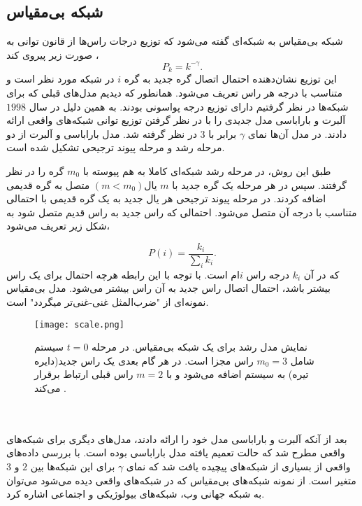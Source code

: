 \subsection{شبکه بی‌مقیاس}
شبکه بی‌مقیاس به شبکه‌ای گفته می‌شود که توزیع درجات راس‌ها از قانون توانی  به صورت زیر پیروی کند \cite{bar}،
\begin{equation}
P_{k} = k^{-\gamma}. 
\end{equation}
این توزیع نشان‌دهنده احتمال اتصال گره جدید به گره $i$ در شبکه مورد نظر است و متناسب با درجه هر راس تعریف می‌شود. 
همانطور که دیدیم مدل‌های قبلی که برای شبکه‌ها در نظر گرفتیم دارای توزیع درجه پواسونی بودند. به همین دلیل در سال $1998$ آلبرت و باراباسی مدل جدیدی را با در نظر گرفتن توزیع توانی شبکه‌های واقعی ارائه دادند\cite{bara,barab}.  در مدل آن‌ها نمای $\gamma$   برابر با $3$  در نظر گرفته شد. مدل باراباسی و آلبرت از دو مرحله رشد و مرحله پیوند ترجیحی تشکیل شده است. 

طبق این روش، در مرحله رشد شبکه‌ای کاملا به هم پیوسته با $m_{0}$  گره را در نظر گرفتند. سپس در هر مرحله یک گره جدید با $m$ یال$(m < m_{0})$ متصل به گره قدیمی اضافه کردند.
در مرحله پیوند ترجیحی هر یال جدید به یک گره قدیمی با احتمالی متناسب با درجه آن متصل می‌شود. احتمالی که راس جدید به راس قدیم متصل شود به شکل زیر تعریف می‌شود،

\begin{equation}
P(i) = \dfrac{k_{i}}{\sum_{i}{k_{i}}}.
\end{equation}
که در آن  $k_{i}$  درجه راس $i$ام است. با توجه با این رابطه هرچه احتمال برای یک راس بیشتر باشد، احتمال اتصال راس جدید به آن راس بیشتر می‌شود. %
مدل بی‌مقیاس نمونه‌ای از "ضرب‌المثل غنی-غنی‌تر میگردد‌" است.
\begin{figure} [htbp]
\centering
\texttt{[image: scale.png]}
\caption[نمایش مدل پیوند رشد برای یک شبکه بی‌مقیاس] {\footnotesize نمایش مدل رشد برای یک شبکه بی‌مقیاس. در مرحله $t = 0$ سیستم شامل $m_{0} = 3$ راس مجزا است. در هر گام بعدی یک راس جدید(دایره تیره) به سیستم اضافه می‌شود و با $m = 2$ راس قبلی ارتباط برقرار می‌کند  \cite{watts}.}
\label{fig:scale}
\end{figure}\\\\
بعد از آنکه آلبرت و باراباسی مدل خود را ارائه دادند، مدل‌های دیگری برای شبکه‌های واقعی مطرح شد که حالت تعمیم یافته مدل باراباسی بوده است.  با بررسی داده‌های واقعی از بسیاری از شبکه‌های پیچیده یافت شد که نمای $\gamma$ برای این شبکه‌‌ها بین $2$ و $3$ متغیر است. از نمونه‌ شبکه‌های بی‌مقیاس که در شبکه‌های واقعی دیده می‌شود می‌توان  به شبکه جهانی وب، شبکه‌های بیولوژیکی و اجتماعی اشاره کرد.

